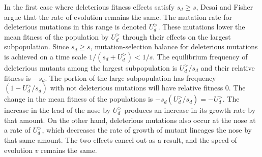 \documentclass[12pt, one column]{article}
\begin{document}
In the first case where deleterious fitness effects satisfy $s_d \geq s$, Desai and Fisher argue that the rate of evolution remains the same.  The mutation rate for deleterious mutations in this range is denoted $U_d^{>}$.  These mutations lower the mean fitness of the population by $U_d^{>}$ through their effects on the largest subpopulation.  Since $s_d \geq s$, mutation-selection balance for deleterious mutations is achieved on a time scale $1/(s_d +U_d^{>}) < 1/s$.  The equilibrium frequency of deleterious mutants among the largest subpopulation is $U_d^{>}/s_d$ and their relative fitness is $-s_d$.  The portion of the large subpopulation has frequency $(1-U_d^{>}/s_d)$ with not deleterious mutations will have relative fitness $0$.  The change in the mean fitness of the populations is $-s_d (U_d^{>}/s_d) = -U_d^{>}$.  The increase in the lead of the nose by $U_d^{>}$ produces an increase in its growth rate by that amount.  On the other hand, deleterious mutations also occur at the nose at a rate of $U_d^{>}$, which decreases the rate of growth of mutant lineages the nose by that same amount.  The two effects cancel out as a result, and the speed of evolution $v$ remains the same.
\end{document}
